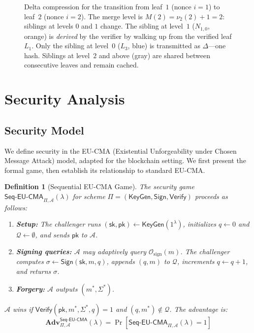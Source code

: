 \documentclass[11pt]{article}
\newtheorem{definition}[theorem]{Definition}
\newcommand{\adv}{\mathbf{Adv}}
\newcommand{\secpar}{\lambda}
\begin{document}
\begin{figure}[t]
\caption{Delta compression for the transition from leaf~$1$ (nonce
$i{=}1$) to leaf~$2$ (nonce $i{=}2$).  The merge level is
$M(2) = \nu_2(2) + 1 = 2$: siblings at levels $0$ and $1$ change.
The sibling at level~$1$ ($N_{1,0}$, \textcolor{orange!70!black}{orange})
is \emph{derived} by the verifier by walking up from the verified leaf
$L_1$.  Only the sibling at level~$0$ ($L_3$,
\textcolor{blue!70!black}{blue}) is transmitted as
$\Delta$---one hash.  Siblings at level~$2$ and above
(\textcolor{black!50}{gray}) are shared between consecutive leaves and
remain cached.}\label{fig:delta}
\end{figure}

\section{Security Analysis}\label{sec:security}

\subsection{Security Model}

We define security in the EU-CMA (Existential Unforgeability under
Chosen Message Attack) model, adapted for the blockchain setting. We
first present the formal game, then establish its relationship to
standard EU-CMA.

\begin{definition}[Sequential EU-CMA Game]\label{def:seqeucma}
The security game $\mathsf{Seq\text{-}EU\text{-}CMA}_{\Pi,\mathcal{A}}(\secpar)$ for
scheme $\Pi = (\mathsf{KeyGen}, \mathsf{Sign}, \mathsf{Verify})$
proceeds as follows:

\begin{enumerate}
\item \textbf{Setup:} The challenger runs $(\mathsf{sk}, \mathsf{pk})
\leftarrow \mathsf{KeyGen}(1^\secpar)$, initializes $q \leftarrow 0$
and $\mathcal{Q} \leftarrow \emptyset$, and sends $\mathsf{pk}$ to
$\mathcal{A}$.

\item \textbf{Signing queries:} $\mathcal{A}$ may adaptively query
$\mathcal{O}_{\mathrm{sign}}(m)$. The challenger computes
$\sigma \leftarrow \mathsf{Sign}(\mathsf{sk}, m, q)$, appends
$(q, m)$ to $\mathcal{Q}$, increments $q \leftarrow q + 1$, and
returns $\sigma$.

\item \textbf{Forgery:} $\mathcal{A}$ outputs $(m^*, \Sigma^*)$.
\end{enumerate}

$\mathcal{A}$ wins if $\mathsf{Verify}(\mathsf{pk}, m^*, \Sigma^*, q) = 1$ and
$(q, m^*) \notin \mathcal{Q}$. The advantage is:
\[
\adv^{\mathsf{Seq\text{-}EU\text{-}CMA}}_{\Pi,\mathcal{A}}(\secpar) =
\Pr[\mathsf{Seq\text{-}EU\text{-}CMA}_{\Pi,\mathcal{A}}(\secpar) = 1]
\]
\end{definition}
\end{document}
